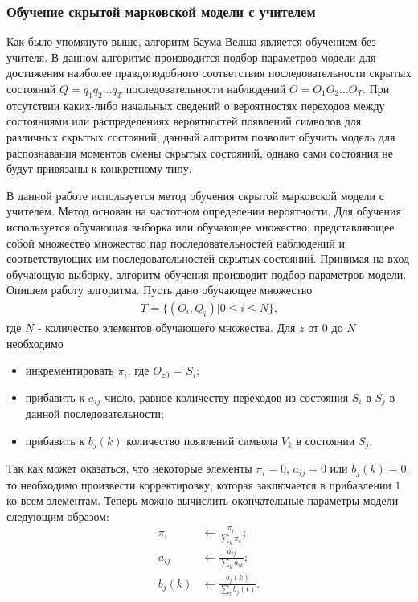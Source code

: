 \subsubsection{Обучение скрытой марковской модели с учителем}
Как было упомянуто выше, алгоритм Баума-Велша является обучением без учителя. В данном алгоритме производится подбор параметров модели для достижения наиболее правдоподобного соответствия последовательности скрытых состояний \(Q=q_1q_2...q_T\) последовательности наблюдений \(O=O_1O_2...O_T\). При отсутствии каких-либо начальных сведений о вероятностях переходов между состояниями или распределениях вероятностей появлений символов для различных скрытых состояний, данный алгоритм позволит обучить модель для распознавания моментов смены скрытых состояний, однако сами состояния не будут привязаны к конкретному типу.

В данной работе используется метод обучения скрытой марковской модели с учителем. Метод основан на частотном определении вероятности. Для обучения используется обучающая выборка или обучающее множество, представляющее собой множество множество пар последовательностей наблюдений и соответствующих им последовательностей скрытых состояний. Принимая на вход обучающую выборку, алгоритм обучения производит подбор параметров модели. Опишем работу алгоритма. Пусть дано обучающее множество
\begin{align}
T = \{(O_i, Q_i) | 0 \le i \le N\} \text{,}
\end{align}
где \(N\) - количество элементов обучающего множества. Для \(z\) от \(0\) до \(N\) необходимо
\begin{itemize}
\item
инкрементировать \(\pi_i\), где \(O_{z0}\) = \(S_i\);
\item
прибавить к \(a_{ij}\) число, равное количеству переходов из состояния \(S_i\) в \(S_j\) в данной последовательности;
\item
прибавить к \(b_j(k)\) количество появлений символа \(V_k\) в состоянии \(S_j\).
\end{itemize}
Так как может оказаться, что некоторые элементы \(\pi_i = 0\), \(a_{ij} = 0\) или \(b_j(k) = 0\), то необходимо произвести корректировку, которая заключается в прибавлении \(1\) ко всем элементам.
Теперь можно вычислить окончательные параметры модели следующим образом:
\begin{align}
	\pi_i &\leftarrow \frac{\pi_i}{\displaystyle\sum_{k} \pi_k}; \\
	a_{ij} &\leftarrow \frac{a_{ij}}{\displaystyle\sum_{k} a_{ik}}; \\
	b_j(k) &\leftarrow \frac{b_j(k)}{\displaystyle\sum_{t} b_j(t)}.
\end{align}


